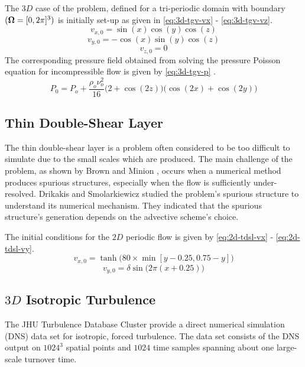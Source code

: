The $3D$ case of the problem, defined for a tri-periodic domain with boundary $(\bm{\Omega} = [0, 2\pi]^3)$ is initially set-up as given in \ref{eq:3d-tgv-vx} - \ref{eq:3d-tgv-vz}.
\begin{equation}
    v_{x, 0} = \sin(x) \cos(y) \cos(z)
    \label{eq:3d-tgv-vx}
\end{equation}
\begin{equation}
    v_{y, 0} = -\cos(x) \sin(y) \cos(z)
    \label{eq:3d-tgv-vy}
\end{equation}
\begin{equation}
    v_{z, 0} = 0
    \label{eq:3d-tgv-vz}
\end{equation}
The corresponding pressure field obtained from solving the pressure Poisson equation for incompressible flow is given by \ref{eq:3d-tgv-p} \parencite{pereira2021modeling}.
\begin{equation}
    P_{0} = P_o + \frac{\rho_o \nu_o^2}{16} \bigg(2 + \cos(2z) \bigg) \bigg(\cos(2x) + \cos(2y) \bigg)
    \label{eq:3d-tgv-p}
\end{equation}

\subsection{Thin Double-Shear Layer}
The thin double-shear layer is a problem often considered to be too difficult to simulate due to the small scales which are produced. 
The main challenge of the problem, as shown by Brown and Minion \parencite{minion1997performance}, occurs when a numerical method produces spurious structures, especially when the flow is sufficiently under-resolved. 
Drikakis and Smolarkiewicz \parencite{drikakis2001spurious} studied the problem's spurious structure to understand its numerical mechanism. They indicated that the spurious structure's generation depends on the advective scheme's choice. 

The initial conditions for the $2D$ periodic flow is given by \ref{eq:2d-tdsl-vx} - \ref{eq:2d-tdsl-vy}.
\begin{equation}
    v_{x, 0} = \tanh \big(80 \times \min[y-0.25, 0.75-y] \big)
    \label{eq:2d-tdsl-vx}
\end{equation}
\begin{equation}
    v_{y, 0} = \delta \sin \big( 2\pi (x+0.25) \big)
    \label{eq:2d-tdsl-vy}
\end{equation}

\subsection{$3D$ Isotropic Turbulence}
The JHU Turbulence Database Cluster \parencite{li2008public} provide a direct numerical simulation (DNS) data set for isotropic, forced turbulence. The data set consists of the DNS output on $1024^3$ spatial points and $1024$ time samples spanning about one large-scale turnover time.

